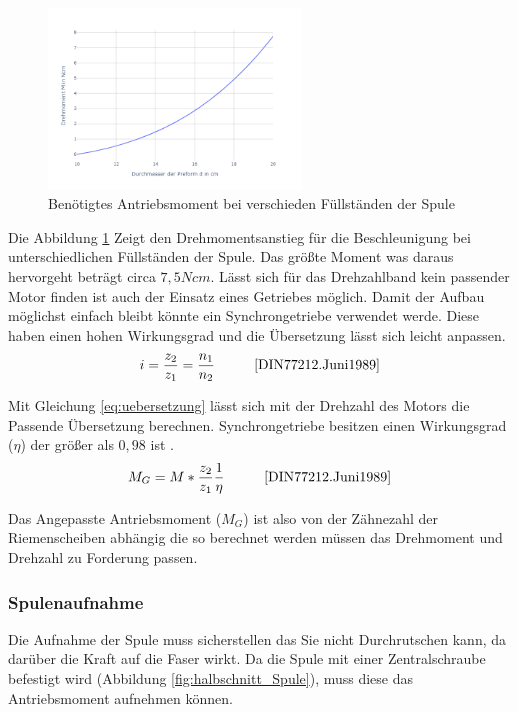 \begin{figure}[!h]
    \centering
    \includegraphics[width = 0.6\textwidth]{Abbildungen/MG_from J.png}
    \caption{Benötigtes Antriebsmoment bei verschieden Füllständen der Spule}
    \label{fig:MG_fromJP}
\end{figure}

Die Abbildung \ref{fig:MG_fromJP} Zeigt den Drehmomentsanstieg für die Beschleunigung bei unterschiedlichen Füllständen der Spule. Das größte Moment was daraus hervorgeht beträgt circa $7,5 Ncm$. Lässt sich für das Drehzahlband kein passender Motor finden ist auch der Einsatz eines Getriebes möglich. Damit der Aufbau möglichst einfach bleibt könnte ein Synchrongetriebe verwendet werde. Diese haben einen hohen Wirkungsgrad und die Übersetzung lässt sich leicht anpassen.
\begin{equation}\label{eq:uebersetzung}
     i=\frac{z_2}{z_1} = \frac{n_1}{n_2} \hspace{10mm} \cite{DIN77212.Juni1989}
\end{equation}

Mit Gleichung \ref{eq:uebersetzung} lässt sich mit der Drehzahl des Motors die Passende Übersetzung berechnen. Synchrongetriebe besitzen einen Wirkungsgrad ($\eta$) der größer als $0,98$ ist \cite{DIN77212.Juni1989}.
\begin{equation}\label{eq:m_synchrongetriebe}
    M_G = M*\frac{z_2}{z_1}\frac{1}{\eta} \hspace{10mm} \cite{DIN77212.Juni1989}
\end{equation}

Das Angepasste Antriebsmoment ($M_G$) ist also von der Zähnezahl der Riemenscheiben abhängig die so berechnet werden müssen das Drehmoment und Drehzahl zu Forderung passen.



\subsubsection{Spulenaufnahme}
Die Aufnahme der Spule muss sicherstellen das Sie nicht Durchrutschen kann, da darüber die Kraft auf die Faser wirkt. Da die Spule mit einer Zentralschraube befestigt wird (Abbildung \ref{fig:halbschnitt_Spule}), muss diese das Antriebsmoment aufnehmen können.

